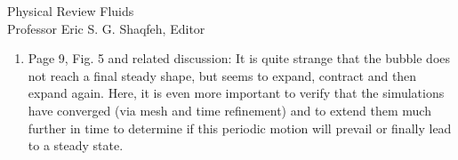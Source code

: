 \documentclass{letter}
\begin{document}
\begin{letter}{
Physical Review Fluids\\
Professor Eric S. G. Shaqfeh, Editor\\}
\begin{enumerate}
Also, regarding the channel $Re$ number, we obtain $Re_{\rm channel} =
\frac{\rho_{\rm m}2VH}{\mu_{\rm m}}$ = 3300 for a simple linear shear-flow.  As
expected, $Re_{\rm channel} = 3300$ falls within turbulence conditions for
simple linear shear-flow of a single phase fluid.  It is important to note that
the generation of turbulence is suppressed and turbulent eddy dissipation
becomes large if bubbles exist in fluid flows. However, as far as we know,
there are no conclusive results on turbulence in a simple linear shear-flow
which includes bubbles.  We predict that the generation of turbulence is
considerably suppressed when bubbles occupy a significant portion of the
flow in a channel, as in this study. At present, we believe that our
computations based on the assumption of laminar flows are reasonable and not
unrealistic.\\

\par\noindent
\item
\textsf
{Page 9, Fig. 5 and related discussion: It is quite strange that the bubble
does not reach a final steady shape, but seems to expand, contract and then
expand again. Here, it is even more important to verify that the simulations
have converged (via mesh and time refinement) and to extend them much further
in time to determine if this periodic motion will prevail or finally lead to a
steady state.}
\vspace{3 mm}


\end{enumerate}
\end{letter}
\end{document}
